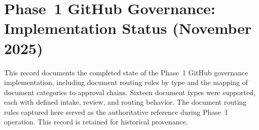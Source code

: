
\section*{Phase~1 GitHub Governance: Implementation Status (November 2025)}

This record documents the completed state of the Phase~1 GitHub governance
implementation, including document routing rules by type and the mapping of
document categories to approval chains. Sixteen document types were supported,
each with defined intake, review, and routing behavior. The document routing
rules captured here served as the authoritative reference during Phase~1
operation. This record is retained for historical provenance.
